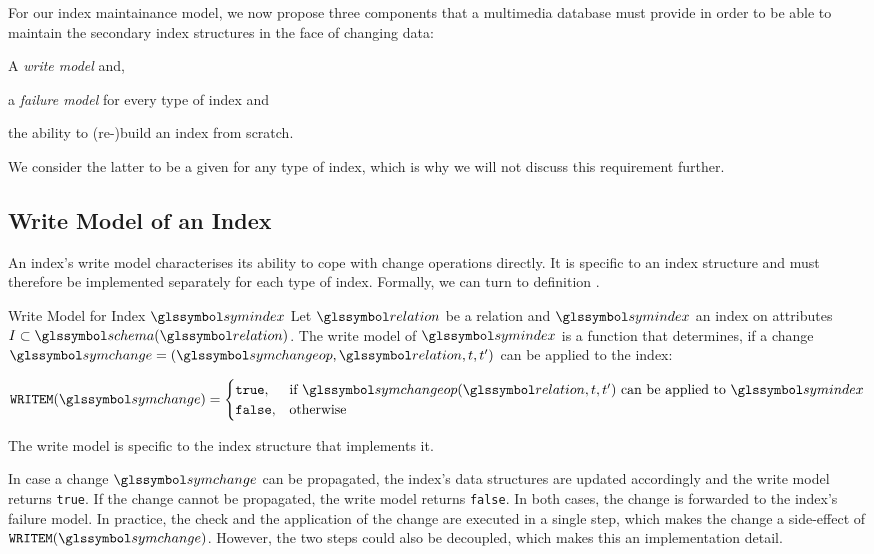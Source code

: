 For our index maintainance model, we now propose three components that a multimedia database must provide in order to be able to maintain the secondary index structures in the face of changing data: 
\begin{enumerate*}[label=(\roman*)]
    \item A \emph{write model} and,
    \item a \emph{failure model} for every type of index and
    \item the ability to (re-)build an index from scratch.
\end{enumerate*}
We consider the latter to be a given for any type of index, which is why we will not discuss this requirement further.

\subsection{Write Model of an Index}
An index's write model characterises its ability to cope with change operations directly. It is specific to an index structure and must therefore be implemented separately for each type of index. Formally, we can turn to definition .

\begin{definition}[label=definition:write_mode]{Write Model for Index $\symindex$}{}
    Let $\relation$ be a relation and $\symindex$ an index on attributes $I \subset \schema(\relation)$. The write model of $\symindex$ is a function that determines, if a change $\symchange = (\symchangeop, \relation, t, t^{\prime})$ can be applied to the index:

    \begin{equation}
        \mathtt{WRITEM}(\symchange) = 
        \begin{cases}
           \mathtt{true},       & \text{if } \symchangeop(\relation,t,t^{\prime}) \text{ can be applied to } \symindex \\
           \mathtt{false},      & \text{otherwise}
        \end{cases}
    \end{equation}

    The write model is specific to the index structure that implements it.
\end{definition}

In case a change $\symchange$ can be propagated, the index's data structures are updated accordingly and the write model returns \texttt{true}. If the change cannot be propagated, the write model returns \texttt{false}. In both cases, the change is forwarded to the index's failure model. In practice, the check and the application of the change are executed in a single step, which makes the change a side-effect of $ \mathtt{WRITEM}(\symchange)$. However, the two steps could also be decoupled, which makes this an implementation detail.


